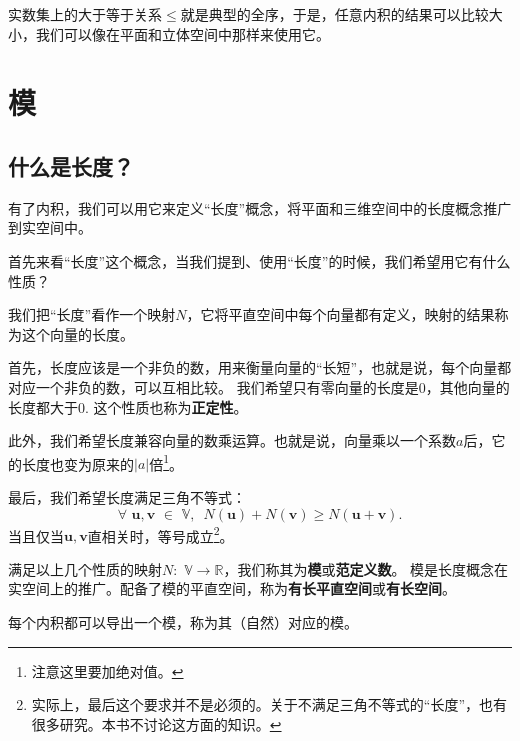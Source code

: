 \documentclass[12pt,UTF8,fontset=none]{ctexbook}
\begin{document}
实数集上的大于等于关系$\leqslant$就是典型的全序，于是，任意内积的结果可以比较大小，我们可以像在平面和立体空间中那样来使用它。

\section{模}
\subsection{什么是长度？}
有了内积，我们可以用它来定义“长度”概念，将平面和三维空间中的长度概念推广到实空间中。

首先来看“长度”这个概念，当我们提到、使用“长度”的时候，我们希望用它有什么性质？

我们把“长度”看作一个映射$N$，它将平直空间中每个向量都有定义，映射的结果称为这个向量的长度。

首先，长度应该是一个非负的数，用来衡量向量的“长短”，也就是说，每个向量都对应一个非负的数，可以互相比较。
我们希望只有零向量的长度是0，其他向量的长度都大于0.
这个性质也称为\textbf{正定性}。

此外，我们希望长度兼容向量的数乘运算。也就是说，向量乘以一个系数$a$后，它的长度也变为原来的$|a|$倍\footnote{注意这里要加绝对值。}。

最后，我们希望长度满足三角不等式：
$$ \forall \,\, \mathbf{u}, \mathbf{v}  \,\, \in \,\, \mathbb{V}, \,\,\, N(\mathbf{u}) + N(\mathbf{v}) \geqslant N(\mathbf{u}+\mathbf{v}). $$
当且仅当$\mathbf{u}, \mathbf{v}$直相关时，等号成立\footnote{实际上，最后这个要求并不是必须的。关于不满足三角不等式的“长度”，也有很多研究。本书不讨论这方面的知识。}。

满足以上几个性质的映射$N : \,\, \mathbb{V} \rightarrow \mathbb{R}$，我们称其为\textbf{模}或\textbf{范定义数}。
模是长度概念在实空间上的推广。配备了模的平直空间，称为\textbf{有长平直空间}或\textbf{有长空间}。

\begin{pp}\label{pp:7_1}
    每个内积都可以导出一个模，称为其（自然）对应的模。
\end{pp}
\end{document}
